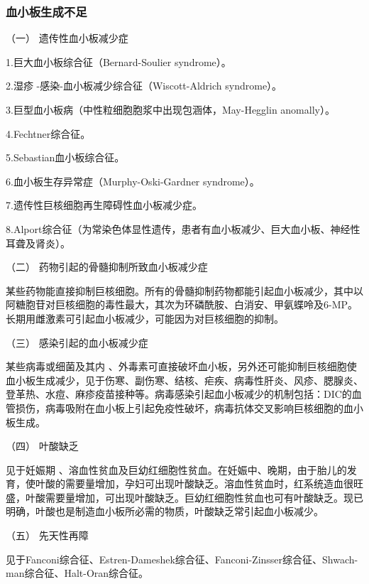 \subsubsection{血小板生成不足}

\hypertarget{text00332.htmlux5cux23CHP12-1-2-1-1-1}{}
（一） 遗传性血小板减少症

1.巨大血小板综合征（Bernard-Soulier syndrome）。

2.湿疹 -感染-血小板减少综合征（Wiscott-Aldrich syndrome）。

3.巨型血小板病（中性粒细胞胞浆中出现包涵体，May-Hegglin anomally）。

4.Fechtner综合征。

5.Sebastian血小板综合征。

6.血小板生存异常症（Murphy-Oski-Gardner syndrome）。

7.遗传性巨核细胞再生障碍性血小板减少症。

8.Alport综合征（为常染色体显性遗传，患者有血小板减少、巨大血小板、神经性耳聋及肾炎）。

\hypertarget{text00332.htmlux5cux23CHP12-1-2-1-1-2}{}
（二） 药物引起的骨髓抑制所致血小板减少症

某些药物能直接抑制巨核细胞。所有的骨髓抑制药物都能引起血小板减少，其中以阿糖胞苷对巨核细胞的毒性最大，其次为环磷酰胺、白消安、甲氨蝶呤及6-MP。长期用雌激素可引起血小板减少，可能因为对巨核细胞的抑制。

\hypertarget{text00332.htmlux5cux23CHP12-1-2-1-1-3}{}
（三） 感染引起的血小板减少症

某些病毒或细菌及其内
、外毒素可直接破坏血小板，另外还可能抑制巨核细胞使血小板生成减少，见于伤寒、副伤寒、结核、疟疾、病毒性肝炎、风疹、腮腺炎、登革热、水痘、麻疹疫苗接种等。病毒感染引起血小板减少的机制包括：DIC的血管损伤，病毒吸附在血小板上引起免疫性破坏，病毒抗体交叉影响巨核细胞的血小板生成。

\hypertarget{text00332.htmlux5cux23CHP12-1-2-1-1-4}{}
（四） 叶酸缺乏

见于妊娠期
、溶血性贫血及巨幼红细胞性贫血。在妊娠中、晚期，由于胎儿的发育，使叶酸的需要量增加，孕妇可出现叶酸缺乏。溶血性贫血时，红系统造血很旺盛，叶酸需要量增加，可出现叶酸缺乏。巨幼红细胞性贫血也可有叶酸缺乏。现已明确，叶酸也是制造血小板所必需的物质，叶酸缺乏常引起血小板减少。

\hypertarget{text00332.htmlux5cux23CHP12-1-2-1-1-5}{}
（五） 先天性再障

见于Fanconi综合征、Estren-Dameshek综合征、Fanconi-Zinsser综合征、Shwach-man综合征、Halt-Oran综合征。

